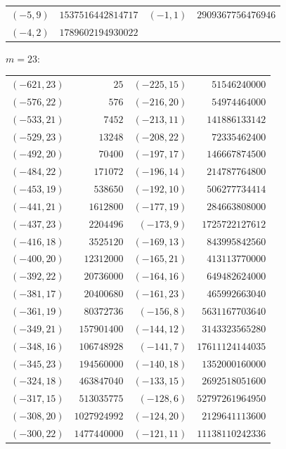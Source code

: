 {\scriptsize\begin{tabular}{@{}r@{\ \ }r@{\qquad}r@{\ \ }r@{}}
$(-5,9)$ & $1537516442814717$ & $(-1,1)$ & $2909367756476946$ \\
$(-4,2)$ & $1789602194930022$ & & \\
\end{tabular}}\par\medskip
\noindent$m=23$:\nopagebreak\\[2pt]
{\scriptsize\begin{tabular}{@{}r@{\ \ }r@{\qquad}r@{\ \ }r@{}}
$(-621,23)$ & $25$ & $(-225,15)$ & $51546240000$ \\
$(-576,22)$ & $576$ & $(-216,20)$ & $54974464000$ \\
$(-533,21)$ & $7452$ & $(-213,11)$ & $141886133142$ \\
$(-529,23)$ & $13248$ & $(-208,22)$ & $72335462400$ \\
$(-492,20)$ & $70400$ & $(-197,17)$ & $146667874500$ \\
$(-484,22)$ & $171072$ & $(-196,14)$ & $214787764800$ \\
$(-453,19)$ & $538650$ & $(-192,10)$ & $506277734414$ \\
$(-441,21)$ & $1612800$ & $(-177,19)$ & $284663808000$ \\
$(-437,23)$ & $2204496$ & $(-173,9)$ & $1725722127612$ \\
$(-416,18)$ & $3525120$ & $(-169,13)$ & $843995842560$ \\
$(-400,20)$ & $12312000$ & $(-165,21)$ & $413113770000$ \\
$(-392,22)$ & $20736000$ & $(-164,16)$ & $649482624000$ \\
$(-381,17)$ & $20400680$ & $(-161,23)$ & $465992663040$ \\
$(-361,19)$ & $80372736$ & $(-156,8)$ & $5631167703640$ \\
$(-349,21)$ & $157901400$ & $(-144,12)$ & $3143323565280$ \\
$(-348,16)$ & $106748928$ & $(-141,7)$ & $17611124144035$ \\
$(-345,23)$ & $194560000$ & $(-140,18)$ & $1352000160000$ \\
$(-324,18)$ & $463847040$ & $(-133,15)$ & $2692518051600$ \\
$(-317,15)$ & $513035775$ & $(-128,6)$ & $52797261964950$ \\
$(-308,20)$ & $1027924992$ & $(-124,20)$ & $2129641113600$ \\
$(-300,22)$ & $1477440000$ & $(-121,11)$ & $11138110242336$ \\

\end{tabular}}

